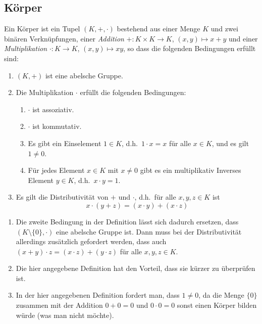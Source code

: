 \subsection{Körper}


\begin{defi}
 Ein Körper ist ein Tupel $(K, +, \cdot)$ bestehend aus einer Menge $K$ und zwei binären Verknüpfungen, einer \emph{Addition} $+ \colon K \times K \to K$, $(x,y) \mapsto x + y$ und einer \emph{Multiplikation} $\cdot \colon K \to K$, $(x,y) \mapsto xy$, so dass die folgenden Bedingungen erfüllt sind:
 \begin{enumerate}[label=\roman*)]
  \item
   $(K,+)$ ist eine abelsche Gruppe.
  \item
   Die Multiplikation $\cdot$ erfüllt die folgenden Bedingungen:
   \begin{enumerate}[label=\alph*)]
    \item
     $\cdot$ ist assoziativ.
    \item
     $\cdot$ ist kommutativ.
    \item
     Es gibt ein Einselement $1 \in K$, d.h.\ $1 \cdot x = x$ für alle $x \in K$, und es gilt $1 \neq 0$.
    \item
     Für jedes Element $x \in K$ mit $x \neq 0$ gibt es ein multiplikativ Inverses Element $y \in K$, d.h.\ $x \cdot y = 1$.
   \end{enumerate}
  \item
   Es gilt die Distributivität von $+$ und $\cdot$, d.h.\ für alle $x,y,z \in K$ ist
   \[
    x \cdot (y + z)
    = (x \cdot y) + (x \cdot z)
   \]
 \end{enumerate}
\end{defi}


\begin{bem}
 \begin{enumerate}[leftmargin=*]
  \item
   Die zweite Bedingung in der Definition lässt sich dadurch ersetzen, dass $(K\setminus\{0\},\cdot)$ eine abelsche Gruppe ist. Dann muss bei der Distributivität allerdings zusätzlich gefordert werden, dass auch $(x+y) \cdot z = (x \cdot z) + (y \cdot z)$ für alle $x,y,z \in K$.
  \item
   Die hier angegebene Definition hat den Vorteil, dass sie kürzer zu überprüfen ist.
  \item
   In der hier angegebenen Definition fordert man, dass $1 \neq 0$, da die Menge $\{0\}$ zusammen mit der Addition $0 + 0 = 0$ und $0 \cdot 0 = 0$ sonst einen Körper bilden würde (was man nicht möchte).
 \end{enumerate}
\end{bem}



